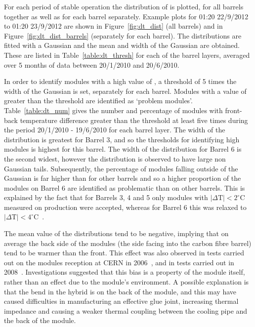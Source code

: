 For each period of stable operation the distribution of \deltat is plotted, for
all barrels together as well as for each barrel separately. Example plots for
01:20 22/9/2012 to 01:20 23/9/2012 are shown in Figure~\ref{fig:dt_dist} (all
barrels) and  in Figure~\ref{fig:dt_dist_barrels} (separately for each barrel).
The distributions are fitted with a Gaussian and the mean and width of the
Gaussian are obtained. These are listed in Table~\ref{table:dt_thresh} for each of the barrel layers, averaged over 5 months of data between 20/1/2010 and 20/6/2010.  

In order to identify modules with a high value of \deltat, a threshold of 5
times the width of the Gaussian is set, separately for each barrel. Modules with
a value of \deltat greater than the threshold are identified as `problem
modules'. Table~\ref{table:dt_num} gives the number and percentage of modules
with front-back temperature difference greater than the threshold at least five
times during the period 20/1/2010 - 19/6/2010 for each barrel layer. The width
of the distribution is greatest for Barrel 3, and so the thresholds for
identifying high \deltat modules is highest for this barrel. The width of the
distribution for Barrel 6 is the second widest, however the distribution is
observed to have large non Gaussian tails. Subsequently, the percentage of
modules falling outside of the Gaussian is far higher than for other barrels and
so a higher proportion of the modules on Barrel 6 are identified as problematic than on other barrels. This is explained by the fact that for Barrels 3, 4 and 5 only modules with $|\Delta \mathrm{T}| < 2^\circ$C measured on production were accepted, whereas for Barrel 6 this was relaxed to $|\Delta \mathrm{T}| < 4^\circ$C~\cite{Viehhauser:2006ix}. 

The mean value of the \deltat distributions tend to be negative, implying that on average the back side of the modules (the side facing into the carbon fibre barrel) tend to be warmer than the front. This effect was also observed in tests carried out on the modules reception at CERN in 2006~\cite{Viehhauser:2006ix}, and in tests carried out in 2008~\cite{Shaw:1229428}. Investigations suggested that this bias is a property of the module itself, rather than an effect due to the module's environment. A possible explanation is that the bend in the hybrid is on the back of the module, and this may have caused difficulties in manufacturing an  effective glue joint, increasing thermal impedance and causing a weaker thermal coupling between the cooling pipe and the back of the module.

